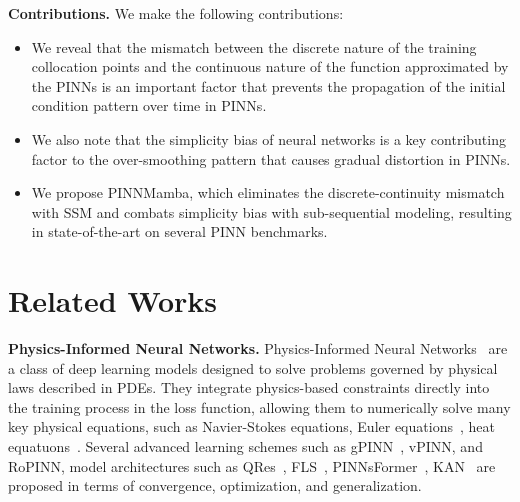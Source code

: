\documentclass{article}
\theoremstyle{plain}
\theoremstyle{definition}
\theoremstyle{remark}
\begin{document}
\textbf{Contributions.} We make the following contributions:
\vspace{-4mm}
\begin{itemize}
    \item We reveal that the mismatch between the discrete nature of the training collocation points and the continuous nature of the function approximated by the PINNs is an important factor that prevents the propagation of the initial condition pattern over time in PINNs.
    \vspace{-2mm}
    \item We also note that the simplicity bias of neural networks is a key contributing factor to the over-smoothing pattern that causes gradual distortion in PINNs.
    \vspace{-2mm}
    \item We propose PINNMamba, which eliminates the discrete-continuity mismatch with SSM and combats simplicity bias with sub-sequential modeling, resulting in state-of-the-art on several PINN benchmarks.
\end{itemize}
\vspace{-2mm}
%
\section{Related Works}
\label{apx:rw}

\textbf{Physics-Informed Neural Networks.}
Physics-Informed Neural Networks~\cite{raissi2019physics} are a class of deep learning models designed to solve problems governed by physical laws described in PDEs. 
    They integrate physics-based constraints directly into the training process in the loss function, allowing them to numerically solve many key physical equations, such as Navier-Stokes equations\cite{jin2021nsfnets}, Euler equations~\cite{mao2020physics}, heat equatuons~\cite{cai2021physics}. Several advanced learning schemes such as gPINN~\cite{kharazmi2019variational}, vPINN\cite{yu2022gradient}, and RoPINN\cite{wu2024ropinn}, model architectures such as QRes~\cite{bu2021quadratic}, FLS~\cite{wong2022learning}, PINNsFormer~\cite{zhao2024pinnsformer}, KAN~\cite{liu2024kan,liu2024kanw} are proposed in terms of convergence, optimization, and generalization.
\end{document}
